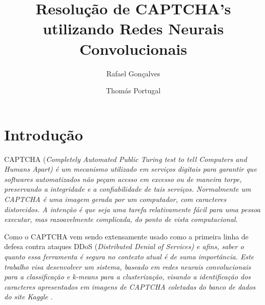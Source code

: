 \documentclass[11pt]{article}
\title{Resolução de CAPTCHA's utilizando Redes Neurais Convolucionais}
\author{Rafael Gonçalves \and Thomás Portugal}
\begin{document}

  \section{Introdu\c{c}\~{a}o}
  \label{sec:introducao}

CAPTCHA (\em Completely Automated Public Turing test to tell Computers and Humans Apart\em ) é um mecanismo utilizado em serviços digitais para garantir que softwares automatizados não peçam acesso em excesso ou de maneira torpe, preservando a integridade e a confiabilidade de tais serviços. Normalmente um CAPTCHA é uma imagem gerada por um computador, com caracteres distorcidos. A intenção é que seja uma tarefa relativamente fácil para uma pessoa executar, mas razoavelmente complicada, do ponto de vista computacional.

Como o CAPTCHA vem sendo extensamente usado como a primeira linha de defesa contra ataques DDoS (\em Distributed Denial of Services\em ) e afins, saber o quanto essa ferramenta é segura no contexto atual é de suma importância.
Este trabalho visa desenvolver um sistema, baseado em redes neurais convolucionais para a classificação e k-means para a clusterização, visando a identificação dos caracteres apresentados em imagens de CAPTCHA coletadas do banco de dados do site Kaggle \cite{data}.
\end{document}
